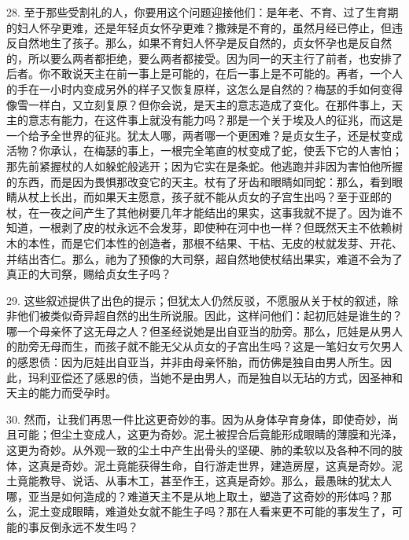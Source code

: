 28. 至于那些受割礼的人，你要用这个问题迎接他们：是年老、不育、过了生育期的妇人怀孕更难，还是年轻贞女怀孕更难？撒辣是不育的，虽然月经已停止，但违反自然地生了孩子。那么，如果不育妇人怀孕是反自然的，贞女怀孕也是反自然的，所以要么两者都拒绝，要么两者都接受。因为同一的天主行了前者，也安排了后者。你不敢说天主在前一事上是可能的，在后一事上是不可能的。再者，一个人的手在一小时内变成另外的样子又恢复原样，这怎么是自然的？梅瑟的手如何变得像雪一样白，又立刻复原？但你会说，是天主的意志造成了变化。在那件事上，天主的意志有能力，在这件事上就没有能力吗？那是一个关于埃及人的征兆，而这是一个给予全世界的征兆。犹太人哪，两者哪一个更困难？是贞女生子，还是杖变成活物？你承认，在梅瑟的事上，一根完全笔直的杖变成了蛇，使丢下它的人害怕；那先前紧握杖的人如躲蛇般逃开；因为它实在是条蛇。他逃跑并非因为害怕他所握的东西，而是因为畏惧那改变它的天主。杖有了牙齿和眼睛如同蛇：那么，看到眼睛从杖上长出，而如果天主愿意，孩子就不能从贞女的子宫生出吗？至于亚郎的杖，在一夜之间产生了其他树要几年才能结出的果实，这事我就不提了。因为谁不知道，一根剥了皮的杖永远不会发芽，即使种在河中也一样？但既然天主不依赖树木的本性，而是它们本性的创造者，那根不结果、干枯、无皮的杖就发芽、开花、并结出杏仁。那么，祂为了预像的大司祭，超自然地使杖结出果实，难道不会为了真正的大司祭，赐给贞女生子吗？\par

29. 这些叙述提供了出色的提示；但犹太人仍然反驳，不愿服从关于杖的叙述，除非他们被类似奇异超自然的出生所说服。因此，这样问他们：起初厄娃是谁生的？哪一个母亲怀了这无母之人？但圣经说她是出自亚当的肋旁。那么，厄娃是从男人的肋旁无母而生，而孩子就不能无父从贞女的子宫出生吗？这是一笔妇女亏欠男人的感恩债：因为厄娃出自亚当，并非由母亲怀胎，而仿佛是独自由男人所生。因此，玛利亚偿还了感恩的债，当她不是由男人，而是独自以无玷的方式，因圣神和天主的能力而受孕时。\par

30. 然而，让我们再思一件比这更奇妙的事。因为从身体孕育身体，即使奇妙，尚且可能；但尘土变成人，这更为奇妙。泥土被捏合后竟能形成眼睛的薄膜和光泽，这更为奇妙。从外观一致的尘土中产生出骨头的坚硬、肺的柔软以及各种不同的肢体，这真是奇妙。泥土竟能获得生命，自行游走世界，建造房屋，这真是奇妙。泥土竟能教导、说话、从事木工，甚至作王，这真是奇妙。那么，最愚昧的犹太人哪，亚当是如何造成的？难道天主不是从地上取土，塑造了这奇妙的形体吗？那么，泥土变成眼睛，难道处女就不能生子吗？那在人看来更不可能的事发生了，可能的事反倒永远不发生吗？\par

